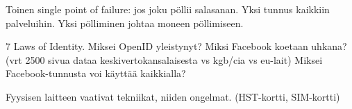 \documentclass[finnish,gradu]{tktltiki}
\begin{document}
  Toinen single point of failure: jos joku pöllii salasanan. Yksi tunnus kaikkiin palveluihin. Yksi pölliminen johtaa moneen pöllimiseen.

    7 Laws of Identity.
    Miksei OpenID yleistynyt?
    Miksi Facebook koetaan uhkana? (vrt 2500 sivua dataa keskivertokansalaisesta vs kgb/cia vs eu-lait)
    Miksei Facebook-tunnusta voi käyttää kaikkialla?

    Fyysisen laitteen vaativat tekniikat, niiden ongelmat. (HST-kortti, SIM-kortti)


\end{document}
